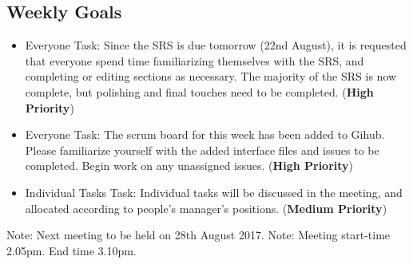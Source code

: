 \documentclass[11pt, a4paper]{article}
\begin{document}
\begin{flushleft}
  \subsection{Weekly Goals}
  \begin{itemize}
  \item Everyone
  \linebreak Task: Since the SRS is due tomorrow (22nd August), it is requested that everyone spend time familiarizing themselves with the SRS, and completing or editing sections as necessary. The majority of the SRS is now complete, but polishing and final touches need to be completed. ({\bf High  Priority})
  \end{itemize}
    \begin{itemize}
  \item Everyone
  \linebreak Task: The scrum board for this week has been added to Gihub. Please familiarize yourself with the added interface files and issues to be completed. Begin work on any unassigned issues. ({\bf High  Priority})
  \end{itemize}
    \begin{itemize}
  \item Individual Tasks
  \linebreak Task: Individual tasks will be discussed in the meeting, and allocated according to people's manager's positions. ({\bf Medium  Priority})
  \end{itemize}
  \vspace*{10pt}
  \noindent Note: Next meeting to be held on 28th August 2017.
  \noindent\linebreak Note: Meeting start-time 2.05pm. End time 3.10pm.
  \end{flushleft}

  
\end{document}
